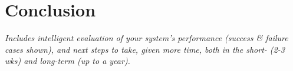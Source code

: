\section{Conclusion}
\textit{Includes intelligent evaluation of your system’s performance (success \& failure cases shown), and next steps to take, given more time, both in the short- (2-3 wks) and long-term (up to a year).}